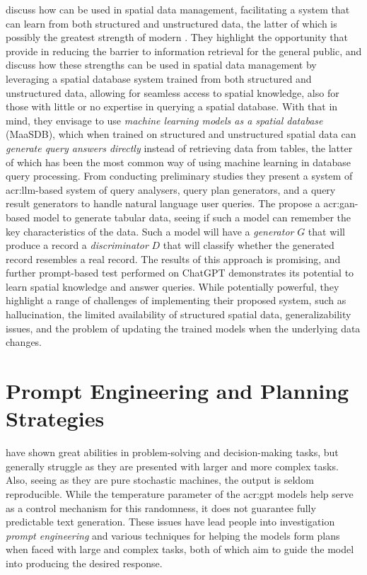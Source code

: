 \cite{qiMaaSDBSpatialDatabases2023} discuss how  can be used in spatial data management, facilitating a system that can learn from both structured and unstructured data, the latter of which is possibly the greatest strength of modern . They highlight the opportunity that  provide in reducing the barrier to information retrieval for the general public, and discuss how these strengths can be used in spatial data management by leveraging a spatial database system trained from both structured and unstructured data, allowing for seamless access to spatial knowledge, also for those with little or no expertise in querying a spatial database. With that in mind, they envisage to use \textit{machine learning models as a spatial database} (MaaSDB), which when trained on structured and unstructured spatial data can \textit{generate query answers directly} instead of retrieving data from tables, the latter of which has been the most common way of using machine learning in database query processing. From conducting preliminary studies they present a system of \acrshort{acr:llm}-based system of query analysers, query plan generators, and a query result generators to handle natural language user queries. The propose a \gls{acr:gan}-based model to generate tabular data, seeing if such a model can remember the key characteristics of the data. Such a model will have a \textit{generator} $G$ that will produce a record a \textit{discriminator} $D$ that will classify whether the generated record resembles a real record. The results of this approach is promising, and further prompt-based test performed on ChatGPT demonstrates its potential to learn spatial knowledge and answer queries. While potentially powerful, they highlight a range of challenges of implementing their proposed system, such as hallucination, the limited availability of structured spatial data, generalizability issues, and the problem of updating the trained models when the underlying data changes.

\section{Prompt Engineering and Planning Strategies}\label{subsec:prompt-engineering-and-planning-strategies}

 have shown great abilities in problem-solving and decision-making tasks, but generally struggle as they are presented with larger and more complex tasks. Also, seeing as they are pure stochastic machines, the output is seldom reproducible. While the temperature parameter of the \acrshort{acr:gpt} models help serve as a control mechanism for this randomness, it does not guarantee fully predictable text generation. These issues have lead people into investigation \textit{prompt engineering} and various techniques for helping the models form plans when faced with large and complex tasks, both of which aim to guide the model into producing the desired response.

